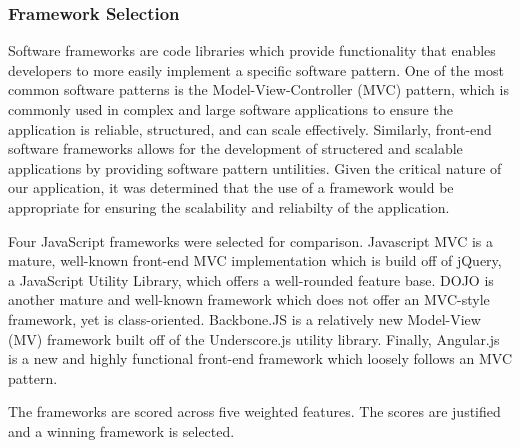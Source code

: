 \documentclass{report}
\begin{document}
\subsubsection{Framework Selection}

Software frameworks are code libraries which provide functionality that enables developers to more easily implement a specific software pattern. One of the most common software patterns is the Model-View-Controller (MVC) pattern, which is commonly used in complex and large software applications to ensure the application is reliable, structured, and can scale effectively. Similarly, front-end software frameworks allows for the development of structered and scalable applications by providing software pattern untilities. Given the critical nature of our application, it was determined that the use of a framework would be appropriate for ensuring the scalability and reliabilty of the application.

Four JavaScript frameworks were selected for comparison. Javascript MVC is a mature, well-known front-end MVC implementation which is build off of jQuery, a JavaScript Utility Library, which offers a well-rounded feature base. DOJO is another mature and well-known framework which does not offer an MVC-style framework, yet is class-oriented. Backbone.JS is a relatively new Model-View (MV) framework built off of the Underscore.js utility library. Finally, Angular.js is a new and highly functional front-end framework which loosely follows an MVC pattern.

The frameworks are scored across five weighted features. The scores are justified and a winning framework is selected.
\end{document}
